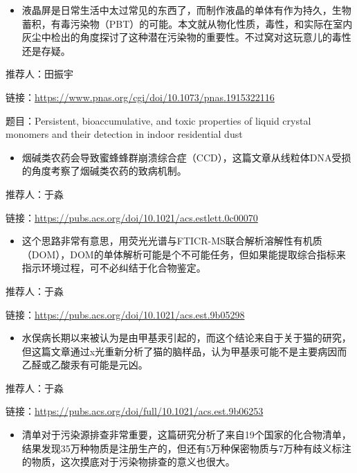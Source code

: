 \documentclass[
]{book}
\providecommand{\tightlist}{%
  \setlength{\itemsep}{0pt}\setlength{\parskip}{0pt}}
\begin{document}
\begin{itemize}
\tightlist
\item
  液晶屏是日常生活中太过常见的东西了，而制作液晶的单体有作为持久，生物蓄积，有毒污染物（PBT）的可能。本文就从物化性质，毒性，和实际在室内灰尘中检出的角度探讨了这种潜在污染物的重要性。不过窝对这玩意儿的毒性还是存疑。
\end{itemize}

推荐人：田振宇

链接：\url{https://www.pnas.org/cgi/doi/10.1073/pnas.1915322116}

题目：Persistent, bioaccumulative, and toxic properties of liquid crystal monomers and their detection in indoor residential dust

\begin{itemize}
\tightlist
\item
  烟碱类农药会导致蜜蜂蜂群崩溃综合症（CCD），这篇文章从线粒体DNA受损的角度考察了烟碱类农药的致病机制。
\end{itemize}

推荐人：于淼

链接：\url{https://pubs.acs.org/doi/10.1021/acs.estlett.0c00070}

\begin{itemize}
\tightlist
\item
  这个思路非常有意思，用荧光光谱与FTICR-MS联合解析溶解性有机质（DOM），DOM的单体解析可能是个不可能任务，但如果能提取综合指标来指示环境过程，可不必纠结于化合物鉴定。
\end{itemize}

推荐人：于淼

链接：\url{https://pubs.acs.org/doi/10.1021/acs.est.9b05298}

\begin{itemize}
\tightlist
\item
  水俣病长期以来被认为是由甲基汞引起的，而这个结论来自于关于猫的研究，但这篇文章通过x光重新分析了猫的脑样品，认为甲基汞可能不是主要病因而乙醛或乙酸汞有可能是元凶。
\end{itemize}

推荐人：于淼

链接：\url{https://pubs.acs.org/doi/full/10.1021/acs.est.9b06253}

\begin{itemize}
\tightlist
\item
  清单对于污染源排查非常重要，这篇研究分析了来自19个国家的化合物清单，结果发现35万种物质是注册生产的，但还有5万种保密物质与7万种有歧义标注的物质，这次摸底对于污染物排查的意义也很大。
\end{itemize}
\end{document}

